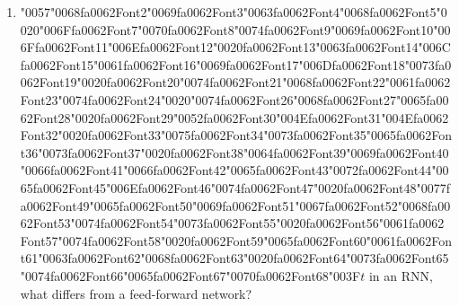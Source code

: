 \documentclass[12pt]{article}
\begin{document}
\begin{enumerate}[label=Q\arabic*.]
 \item {\char"0057}{\char"0068}{\csname fa0062Font2\endcsname\char"0069}{\csname fa0062Font3\endcsname\char"0063}{\csname fa0062Font4\endcsname\char"0068}{\csname fa0062Font5\endcsname\char"0020}{\char"006F}{\csname fa0062Font7\endcsname\char"0070}{\csname fa0062Font8\endcsname\char"0074}{\csname fa0062Font9\endcsname\char"0069}{\csname fa0062Font10\endcsname\char"006F}{\csname fa0062Font11\endcsname\char"006E}{\csname fa0062Font12\endcsname\char"0020}{\csname fa0062Font13\endcsname\char"0063}{\csname fa0062Font14\endcsname\char"006C}{\csname fa0062Font15\endcsname\char"0061}{\csname fa0062Font16\endcsname\char"0069}{\csname fa0062Font17\endcsname\char"006D}{\csname fa0062Font18\endcsname\char"0073}{\csname fa0062Font19\endcsname\char"0020}{\csname fa0062Font20\endcsname\char"0074}{\csname fa0062Font21\endcsname\char"0068}{\csname fa0062Font22\endcsname\char"0061}{\csname fa0062Font23\endcsname\char"0074}{\csname fa0062Font24\endcsname\char"0020}{\char"0074}{\csname fa0062Font26\endcsname\char"0068}{\csname fa0062Font27\endcsname\char"0065}{\csname fa0062Font28\endcsname\char"0020}{\csname fa0062Font29\endcsname\char"0052}{\csname fa0062Font30\endcsname\char"004E}{\csname fa0062Font31\endcsname\char"004E}{\csname fa0062Font32\endcsname\char"0020}{\csname fa0062Font33\endcsname\char"0075}{\csname fa0062Font34\endcsname\char"0073}{\csname fa0062Font35\endcsname\char"0065}{\csname fa0062Font36\endcsname\char"0073}{\csname fa0062Font37\endcsname\char"0020}{\csname fa0062Font38\endcsname\char"0064}{\csname fa0062Font39\endcsname\char"0069}{\csname fa0062Font40\endcsname\char"0066}{\csname fa0062Font41\endcsname\char"0066}{\csname fa0062Font42\endcsname\char"0065}{\csname fa0062Font43\endcsname\char"0072}{\csname fa0062Font44\endcsname\char"0065}{\csname fa0062Font45\endcsname\char"006E}{\csname fa0062Font46\endcsname\char"0074}{\csname fa0062Font47\endcsname\char"0020}{\csname fa0062Font48\endcsname\char"0077}{\csname fa0062Font49\endcsname\char"0065}{\csname fa0062Font50\endcsname\char"0069}{\csname fa0062Font51\endcsname\char"0067}{\csname fa0062Font52\endcsname\char"0068}{\csname fa0062Font53\endcsname\char"0074}{\csname fa0062Font54\endcsname\char"0073}{\csname fa0062Font55\endcsname\char"0020}{\csname fa0062Font56\endcsname\char"0061}{\csname fa0062Font57\endcsname\char"0074}{\csname fa0062Font58\endcsname\char"0020}{\csname fa0062Font59\endcsname\char"0065}{\csname fa0062Font60\endcsname\char"0061}{\csname fa0062Font61\endcsname\char"0063}{\csname fa0062Font62\endcsname\char"0068}{\csname fa0062Font63\endcsname\char"0020}{\csname fa0062Font64\endcsname\char"0073}{\csname fa0062Font65\endcsname\char"0074}{\csname fa0062Font66\endcsname\char"0065}{\csname fa0062Font67\endcsname\char"0070}{\csname fa0062Font68\endcsname\char"003F}$t$ in an RNN, what differs from a feed-forward network?

\end{enumerate}
\end{document}
